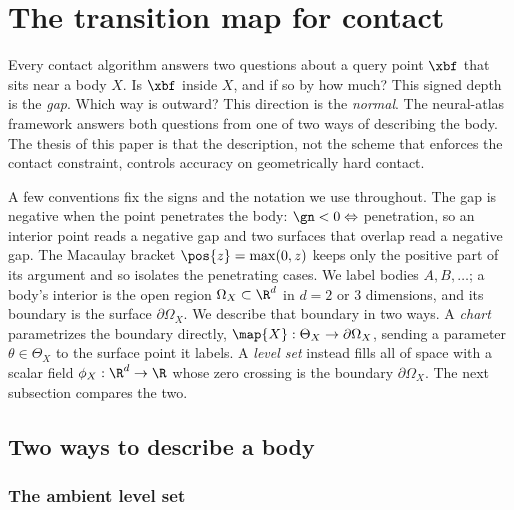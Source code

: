 \section{The transition map for contact}\label{sec:tmap}

Every contact algorithm answers two questions about a query point $\xbf$ that sits near a body $X$. Is
$\xbf$ inside $X$, and if so by how much? This signed depth is the \emph{gap}. Which way is outward? This
direction is the \emph{normal}. The neural-atlas framework answers both questions from one of two ways of
describing the body. The thesis of this paper is that the description, not the scheme that enforces the
contact constraint, controls accuracy on geometrically hard contact.

A few conventions fix the signs and the notation we use throughout. The gap is negative when the point
penetrates the body: $\gn<0\Leftrightarrow$ penetration, so an interior point reads a negative gap and two
surfaces that overlap read a negative gap. The Macaulay bracket $\pos{z}=\max(0,z)$ keeps only the
positive part of its argument and so isolates the penetrating cases. We label bodies $A,B,\dots$; a body's
interior is the open region $\Omega_X\subset\R^d$ in $d=2$ or $3$ dimensions, and its boundary is the
surface $\partial\Omega_X$. We describe that boundary in two ways. A \emph{chart} parametrizes
the boundary directly, $\map{X}:\Theta_X\to\partial\Omega_X$, sending a parameter $\theta\in\Theta_X$ to
the surface point it labels. A \emph{level set} instead fills all of space with a scalar field
$\phi_X:\R^d\to\R$ whose zero crossing is the boundary $\partial\Omega_X$. The next subsection compares the
two.

\subsection{Two ways to describe a body}\label{sec:tmap:two}

\subsubsection{The ambient level set}

